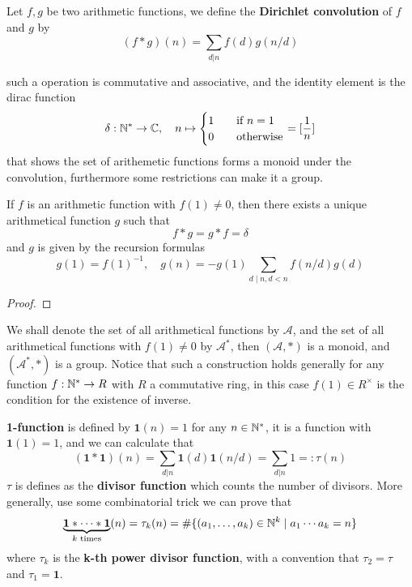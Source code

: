 \begin{definition}
    Let \(f,g\) be two arithmetic functions, we define the \textbf{Dirichlet convolution} of \(f\) and \(g\) by
\[(f * g)(n) = \sum_{d|n} f(d)g(n/d)\]
\end{definition}

such a operation is commutative and associative, and the identity element is the dirac function
\[\delta: \mathbb{N}^* \to \mathbb{C}, \quad n \mapsto \begin{cases}
    1 \quad &\text{if } n = 1\\
    0 \quad &\text{otherwise}
\end{cases} = [\frac{1}{n}]\]
that shows the set of arithemetic functions forms a monoid under the convolution, furthermore some restrictions can make it a group.

\begin{colorproposition}
    If \(f\) is an arithmetic function with \(f(1) \neq 0\), then there exists a unique arithmetical function \(g\) such that 
    \[f*g = g* f = \delta\]
    and \(g\) is given by the recursion formulas
    \[g(1) = f(1)^{-1}, \quad g(n) = -g(1) \sum_{d \mid n, d<n} f(n/d)g(d)\]
\end{colorproposition}
\begin{proof}
    
\end{proof}

\begin{remark}
    We shall denote the set of all arithmetical functions by \(\mathcal{A}\), and the set of all arithmetical functions with \(f(1) \neq 0\) by \(\mathcal{A}^*\), then \((\mathcal{A}, *)\) is a monoid, and \((\mathcal{A}^*, *)\) is a group. Notice that such a construction holds generally for any function \(f: \mathbb{N}^* \to R\) with \(R\) a commutative ring, in this case \(f(1) \in R^\times\) is the condition for the existence of inverse.
\end{remark}

\begin{example}
    \textbf{1-function} is defined by \(\mathbf{1}(n) = 1\) for any \(n \in \mathbb{N}^*\), it is a function with \(\mathbf{1}(1) = 1\), and we can calculate that 
    \[(\mathbf{1} * \mathbf{1})(n) = \sum_{d|n} \mathbf{1}(d)\mathbf{1}(n/d) = \sum_{d|n} 1 =: \tau(n)\]
    \(\tau\) is defines as the \textbf{divisor function} which counts the number of divisors. More generally, use some combinatorial trick we can prove that 
    \[\underbrace{\mathbf{1} * \cdots *\mathbf{1}}_{k \text{ times}} (n) = \tau_k(n) = \# \{(a_1,\dots,a_k) \in \mathbb{N}^k \mid a_1 \cdots a_k = n\} \]
    where \(\tau_k\) is the \textbf{k-th power divisor function}, with a convention that \(\tau_2 = \tau\) and \(\tau_1 = \mathbf{1}\).
    
\end{example}

